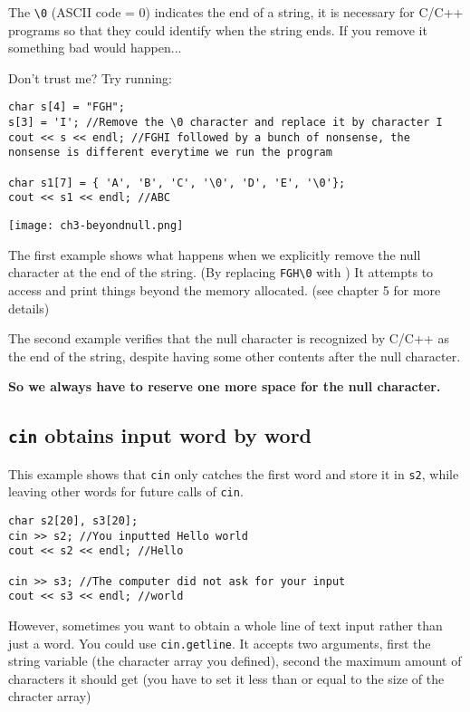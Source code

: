 The \texttt{\textbackslash 0} (ASCII code = 0) indicates the end of a string, it is necessary for C/C++ programs so that they could identify when the string ends. If you remove it something bad would happen...

Don't trust me? Try running:

\begin{lstlisting}
char s[4] = "FGH";
s[3] = 'I'; //Remove the \0 character and replace it by character I
cout << s << endl; //FGHI followed by a bunch of nonsense, the nonsense is different everytime we run the program

char s1[7] = { 'A', 'B', 'C', '\0', 'D', 'E', '\0'};
cout << s1 << endl; //ABC
\end{lstlisting}

\texttt{[image: ch3-beyondnull.png]}

The first example shows what happens when we explicitly remove the null character at the end of the string. (By replacing \texttt{FGH\textbackslash 0} with ) It attempts to access and print things beyond the memory allocated. (see chapter 5 for more details)

The second example verifies that the null character is recognized by C/C++ as the end of the string, despite having some other contents after the null character.

\textbf{So we always have to reserve one more space for the null character.}

\subsection*{\texttt{cin} obtains input word by word}

This example shows that \texttt{cin} only catches the first word and store it in \texttt{s2}, while leaving other words for future calls of \texttt{cin}.

\begin{lstlisting}
char s2[20], s3[20];
cin >> s2; //You inputted Hello world
cout << s2 << endl; //Hello

cin >> s3; //The computer did not ask for your input
cout << s3 << endl; //world
\end{lstlisting}

However, sometimes you want to obtain a whole line of text input rather than just a word. You could use \texttt{cin.getline}. It accepts two arguments, first the string variable (the character array you defined), second the maximum amount of characters it should get (you have to set it less than or equal to the size of the chracter array)

